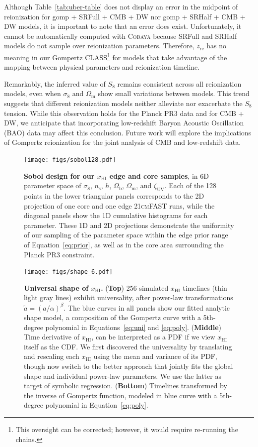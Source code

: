 \documentclass[12pt]{article}
\newcommand{\ns}{n_\mathrm{s}}
\newcommand{\Omegam}{\Omega_\mathrm{m}}
\newcommand{\Omegab}{\Omega_\mathrm{b}}
\newcommand{\zetaUV}{\zeta_\mathrm{UV}}
\newcommand{\HI}{\mathrm{HI}}
\newcommand{\re}{\mathrm{re}}
\newcommand{\ap}{\alpha}
\newcommand{\tilt}{\beta}
\newcommand{\ar}{\tilde{a}}
\begin{document}
Although Table~\ref{tab:uber-table} does not display an error in the midpoint
of reionization for gomp + SRFull + CMB + DW nor gomp + SRHalf + CMB +
DW models, it is important to note that an error does exist.
Unfortunately, it cannot be automatically computed with \textsc{Cobaya}
because SRFull and SRHalf models do not sample over reionization
parameters.
Therefore, $z_\re$ has no meaning in our Gompertz
\textsc{CLASS}\footnote{This oversight can be corrected; however, it
would require re-running the chains.} for models that take advantage of
the mapping between physical parameters and reionization timeline.

Remarkably, the inferred value of $S_8$ remains consistent across all
reionization models, even when $\sigma_8$ and $\Omegam$ show small
variations between models.
This trend suggests that different reionization models neither alleviate
nor exacerbate the $S_8$ tension.
While this observation holds for the Planck PR3 data and for CMB + DW,
we anticipate that incorporating low-redshift Baryon Acoustic
Oscillation (BAO) data may affect this conclusion.
Future work will explore the implications of Gompertz reionization for
the joint analysis of CMB and low-redshift data.




\begin{figure}
\centering
\texttt{[image: figs/sobol128.pdf]}
\caption{\textbf{\boldmath Sobol design for our $x_\HI$ edge and core samples},
in 6D parameter space of $\sigma_8$, $\ns$, $h$, $\Omegab$, $\Omegam$,
and $\zetaUV$.
Each of the 128 points in the lower triangular panels corresponds to the
2D projection of one core and one edge \textsc{21cmFAST} runs, while the
diagonal panels show the 1D cumulative histograms for each parameter.
These 1D and 2D projections demonstrate the uniformity of our sampling
of the parameter space within the edge prior range of Equation~\eqref{eq:prior},
as well as in the core area surrounding the Planck PR3 constraint.}
\label{fig:sobol}
\end{figure}

\begin{figure}
\centering
\texttt{[image: figs/shape\_6.pdf]}
\caption{\textbf{\boldmath Universal shape of $x_\HI$.}
(\textbf{Top}) 256 simulated $x_\HI$ timelines (thin light gray lines)
exhibit universality, after power-law transformations $\ar =
(a/\ap)^\tilt$.
The blue curves in all panels show our fitted analytic shape model, a
composition of the Gompertz curve with a 5th-degree polynomial in
Equations~\eqref{eq:uni} and \eqref{eq:poly}.
(\textbf{Middle}) Time derivative of $x_\HI$, can be interpreted as a PDF
if we view $x_\HI$ itself as the CDF.
We first discovered the universality by translating and rescaling each
$x_\HI$ using the mean and variance of its PDF, though now switch to the
better approach that jointly fits the global shape and individual
power-law parameters.
We use the latter as target of symbolic regression.
(\textbf{Bottom}) Timelines transformed by the inverse of Gompertz
function, modeled in blue curve with a 5th-degree polynomial in
Equation~\eqref{eq:poly}.}
\label{fig:shape}
\end{figure}
\end{document}
